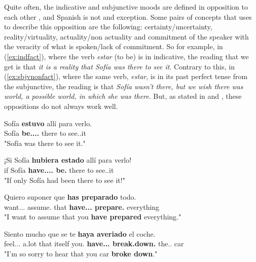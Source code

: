 Quite often, the indicative and subjunctive moods are defined in opposition to each other \citet{lyons1995linguistic}, and Spanish is not and exception. Some pairs of concepts that \citet{espanola2010nueva} uses to describe this opposition are the following: certainty/uncertainty, reality/virtuality, actuality/non actuality and commitment of the speaker with the veracity of what is spoken/lack of commitment. So for example, in (\ref{ex:indfact}), where the verb \textit{estar} (to be) is in indicative, the reading that we get is that \textit{it is a reality that Sofía was there to see it}. Contrary to this, in (\ref{ex:sbjvnonfact}), where the same verb, \textit{estar}, is in its past perfect tense from the subjunctive, the reading is that \textit{Sofía wasn't there, but we wish there was world, a possible world, in which she was there}. But, as stated in \citet{espanola2010nueva} and \citet{sanchez2011aproximacion}, these oppositions do not always work well.\\

\begin{exe}
  \ex
      \begin{xlist}
          \item {\gll Sofía \textbf{estuvo} allí para verlo. \\ Sofía \textbf{be.\Pst.\Pfv.\Ind.\Tsg{}} there to see.\Inf{}.it\\ \glt "Sofía was there to see it."}\label{ex:indfact}
            \item {\gll ¡Si Sofía \textbf{hubiera estado} allí para verlo!\\ if Sofía \textbf{have.\Pst.\Pfv.\Sbjv.\Tsg{}  be.\Ptcp{}} there to see.\Inf{}.it\\ \glt "If only Sofía had been there to see it!"}\label{ex:sbjvnonfact}
      \end{xlist}
  \ex
    \begin{xlist}
      \item  {\gll Quiero suponer que \textbf{has preparado} todo.\\   want.\Prs.\Ind.\Fsg{} assume.\Inf{} that \textbf{have.\Prs.\Ind.\Ssg{} prepare.\Ptcp{}} everything \\ \glt "I want to assume that you \textbf{have prepared} everything."}\label{ex:indnonfact}
      \item {\gll Siento mucho que se te \textbf{haya averiado} el coche.\\  feel.\Prs.\Ind.\Fsg{} a.lot that itself you.\Dat{} \textbf{have.\Prs.\Sbj.\Tsg{} break.down.\Ptcp{}} the.\M.\Sg{} car \\ \glt "I'm so sorry to hear that you car \textbf{broke down}."}\label{ex:sbjvfact}
    \end{xlist}
\end{exe}

